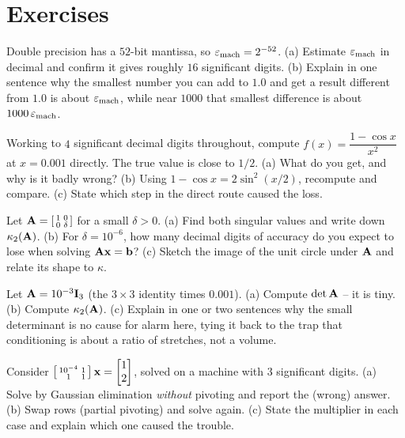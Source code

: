 \section{Exercises}

\begin{exercise}
Double precision has a $52$-bit mantissa, so $\varepsilon_{\text{mach}}=2^{-52}$. (a) Estimate
$\varepsilon_{\text{mach}}$ in decimal and confirm it gives roughly $16$ significant digits.
(b) Explain in one sentence why the smallest number you can add to $1.0$ and get a
result different from $1.0$ is about $\varepsilon_{\text{mach}}$, while near $1000$ that
smallest difference is about $1000\,\varepsilon_{\text{mach}}$.
\end{exercise}

\begin{exercise}
Working to $4$ significant decimal digits throughout, compute $f(x)=\dfrac{1-\cos x}
{x^2}$ at $x=0.001$ directly. The true value is close to $1/2$. (a) What do you
get, and why is it badly wrong? (b) Using $1-\cos x = 2\sin^2(x/2)$, recompute and
compare. (c) State which step in the direct route caused the loss.
\end{exercise}

\begin{exercise}
Let $\mathbf{A}=\left[\begin{smallmatrix}1 & 0\\ 0 & \delta\end{smallmatrix}\right]$ for a
small $\delta>0$. (a) Find both singular values and write down $\kappa_2(\mathbf{A})$. (b)
For $\delta=10^{-6}$, how many decimal digits of accuracy do you expect to lose when
solving $\mathbf{A}\mathbf{x}=\mathbf{b}$? (c) Sketch the image of the unit circle under
$\mathbf{A}$ and relate its shape to $\kappa$.
\end{exercise}

\begin{exercise}
Let $\mathbf{A}=10^{-3}\mathbf{I}_3$ (the $3\times 3$ identity times $0.001$). (a) Compute
$\det\mathbf{A}$ -- it is tiny. (b) Compute $\kappa_2(\mathbf{A})$. (c) Explain in one or two
sentences why the small determinant is no cause for alarm here, tying it back to the
trap that conditioning is about a ratio of stretches, not a volume.
\end{exercise}

\begin{exercise}
Consider $\left[\begin{smallmatrix}10^{-4} & 1\\ 1 & 1\end{smallmatrix}\right]\mathbf{x}=
\begin{bmatrix}1\\2\end{bmatrix}$, solved on a machine with $3$ significant digits. (a) Solve by Gaussian
elimination \emph{without} pivoting and report the (wrong) answer. (b) Swap rows
(partial pivoting) and solve again. (c) State the multiplier in each case and explain
which one caused the trouble.
\end{exercise}

